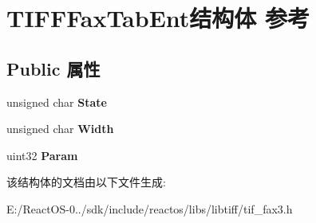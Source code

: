 \hypertarget{struct_t_i_f_f_fax_tab_ent}{}\section{T\+I\+F\+F\+Fax\+Tab\+Ent结构体 参考}
\label{struct_t_i_f_f_fax_tab_ent}
\subsection*{Public 属性}
\begin{DoxyCompactItemize}
\item 
\mbox{\label{struct_t_i_f_f_fax_tab_ent_ada0018146c9bd171192308a06eb669a0}} 
unsigned char {\bfseries State}
\item 
\mbox{\label{struct_t_i_f_f_fax_tab_ent_a30e52f0e26b5314f1c14c8332b391019}} 
unsigned char {\bfseries Width}
\item 
\mbox{\label{struct_t_i_f_f_fax_tab_ent_a1a0b1dd6471cb23c4c854f62268057bc}} 
uint32 {\bfseries Param}
\end{DoxyCompactItemize}


该结构体的文档由以下文件生成\+:\begin{DoxyCompactItemize}
\item 
E\+:/\+React\+O\+S-\/0../sdk/include/reactos/libs/libtiff/tif\+\_\+fax3.\+h\end{DoxyCompactItemize}
